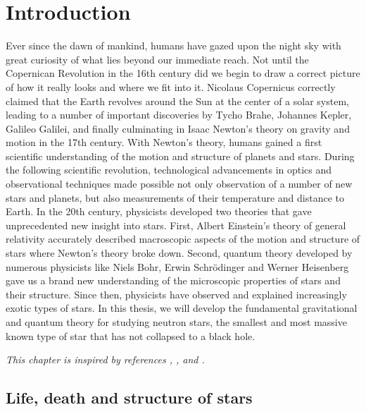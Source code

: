 \setcounter{chapter}{-1} %
\chapter{Introduction}


Ever since the dawn of mankind, humans have gazed upon the night sky with great curiosity of what lies beyond our immediate reach.
Not until the Copernican Revolution in the 16th century did we begin to draw a correct picture of how it really looks and where we fit into it.
Nicolaus Copernicus correctly claimed that the Earth revolves around the Sun at the center of a solar system, leading to a number of important discoveries by Tycho Brahe, Johannes Kepler, Galileo Galilei, and finally culminating in Isaac Newton's theory on gravity and motion in the 17th century.
With Newton's theory, humans gained a first scientific understanding of the motion and structure of planets and stars.
During the following scientific revolution, technological advancements in optics and observational techniques made possible not only observation of a number of new stars and planets, but also measurements of their temperature and distance to Earth.
In the 20th century, physicists developed two theories that gave unprecedented new insight into stars.
First, Albert Einstein's theory of general relativity accurately described macroscopic aspects of the motion and structure of stars where Newton's theory broke down.
Second, quantum theory developed by numerous physicists like Niels Bohr, Erwin Schrödinger and Werner Heisenberg gave us a brand new understanding of the microscopic properties of stars and their structure.
Since then, physicists have observed and explained increasingly exotic types of stars.
In this thesis, we will develop the fundamental gravitational and quantum theory for studying neutron stars, the smallest and most massive known type of star that has not collapsed to a black hole.

\textit{This chapter is inspired by references \cite{ref:glendenning}, \cite{ref:neutron_star_physics}, \cite{ref:lovelace_summary} and \cite{ref:neutron_star_wikipedia}.}

\section{Life, death and structure of stars}

